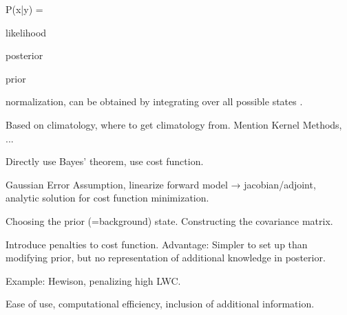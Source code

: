 \startsection[title=Bayesian Statistics]
    \startsubsection[title=Bayes' theorem]
        \startformula
            P(x|y) = 
        \stopformula

         likelihood

         posterior

         prior

         normalization, can be obtained by integrating  over all possible states .
    \stopsubsection

    \startsubsection[title=The Multidimensional Gaussian Distribution]

    \stopsubsection

\stopsection


\startsection[title=Regression Statistical Retrieval]

    Based on climatology, where to get climatology from. Mention Kernel
    Methods, ...
    
    \startsubsection[title=Linear Regression]

    \stopsubsection

    \startsubsection[title=Neural Network]

    \stopsubsection

\stopsection

\startsection[title=Physical Statistical Retrieval]

    Directly use Bayes' theorem, use cost function.

    \startsubsection[title=1D-VAR]

        Gaussian Error Assumption, linearize forward model → jacobian/adjoint,
        analytic solution for cost function minimization.

    \stopsubsection

    \startsubsection[title=Constructing the Prior]

        Choosing the prior (=background) state. Constructing the covariance
        matrix.

    \stopsubsection

    \startsubsection[title=Introducing Constraints by Regularization]

        Introduce penalties to cost function. Advantage: Simpler to set up
        than modifying prior, but no representation of additional knowledge
        in posterior.

        Example: Hewison, penalizing high LWC.

    \stopsubsection

\stopsection


\startsection[title=Comparison of Techniques]

    Ease of use, computational efficiency, inclusion of additional information.

\stopsection

